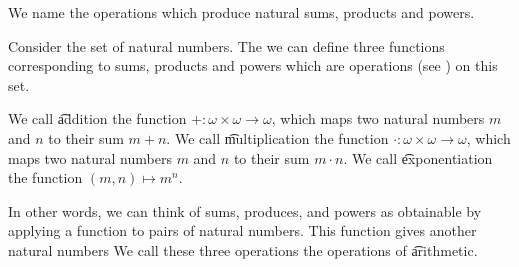 


We name the operations which produce natural sums, products and powers.


Consider the set of natural numbers.
The we can define three functions corresponding to sums, products and powers which are operations (see ) on this set.

We call \t{addition} the function $+: \omega \times \omega \to \omega$, which maps two natural numbers $m$ and $n$ to their sum $m + n$.
We call \t{multiplication} the function $\cdot: \omega \times \omega \to \omega$, which maps two natural numbers $m$ and $n$ to their sum $m \cdot n$.
We call \t{exponentiation} the function $(m, n) \mapsto m^n$.

In other words, we can think of sums, produces, and powers as obtainable by applying a function to pairs of natural numbers.
This function gives another natural numbers
We call these three operations the operations of \t{arithmetic}.

\blankpage
